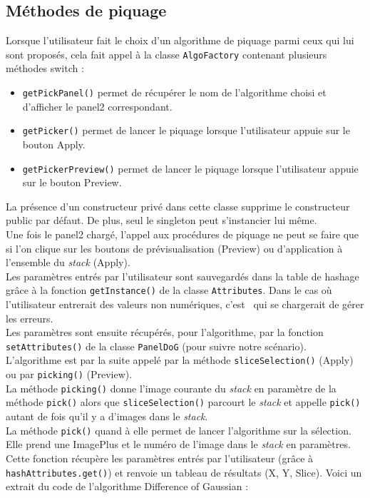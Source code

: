 \subsection{Méthodes de piquage}

Lorsque l'utilisateur fait le choix d'un algorithme de piquage parmi ceux qui lui sont proposés, cela fait appel à la classe \texttt{AlgoFactory} contenant plusieurs méthodes switch :
\begin{itemize}
\item \texttt{getPickPanel()} permet de récupérer le nom de l'algorithme choisi et d'afficher le panel2 correspondant.
\item \texttt{getPicker()} permet de lancer le piquage lorsque l'utilisateur appuie sur le bouton Apply.
\item \texttt{getPickerPreview()} permet de lancer le piquage lorsque l'utilisateur appuie sur le bouton Preview.
\end{itemize}

La présence d'un constructeur privé dans cette classe supprime le constructeur public par défaut. De plus, seul le singleton peut s'instancier lui même. \\

Une fois le panel2 chargé, l'appel aux procédures de piquage ne peut se faire que si l'on clique sur les boutons de prévisualisation (Preview) ou d'application à l'ensemble du \textit{stack} (Apply). \\
Les paramètres entrés par l'utilisateur sont sauvegardés dans la table de hashage grâce à la fonction \texttt{getInstance()} de la classe \texttt{Attributes}. Dans le cas où l'utilisateur entrerait des valeurs non numériques, c'est \imj ~qui se chargerait de gérer les erreurs. \\
Les paramètres sont ensuite récupérés, pour l'algorithme, par la fonction \texttt{setAttributes()} de la classe \texttt{PanelDoG} (pour suivre notre scénario). \\
 L'algorithme est par la suite appelé par la méthode \texttt{sliceSelection()} (Apply) ou par \texttt{picking()} (Preview). \\

La méthode \texttt{picking()} donne l'image courante du \textit{stack} en paramètre de la méthode \texttt{pick()} alors que \texttt{sliceSelection()} parcourt le \textit{stack} et appelle \texttt{pick()} autant de fois qu'il y a d'images dans le \textit{stack}. \\

La méthode \texttt{pick()} quand à elle permet de lancer l'algorithme sur la sélection. Elle prend une ImagePlus et le numéro de l'image dans le \textit{stack} en paramètres. Cette fonction récupère les paramètres entrés par l'utilisateur (grâce à \texttt{hashAttributes.get()}) et renvoie un tableau de résultats (X, Y, Slice). Voici un extrait du code de l'algorithme Difference of Gaussian :

